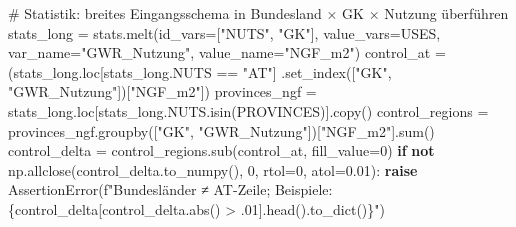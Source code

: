 \documentclass[
  ngerman,
  a4paper,
  DIV=11]{scrreprt}
\newenvironment{Shaded}{\begin{snugshade}}{\end{snugshade}}
\newcommand{\BuiltInTok}[1]{\textcolor[rgb]{0.00,0.23,0.31}{#1}}
\newcommand{\CommentTok}[1]{\textcolor[rgb]{0.37,0.37,0.37}{#1}}
\newcommand{\ControlFlowTok}[1]{\textcolor[rgb]{0.00,0.23,0.31}{\textbf{#1}}}
\newcommand{\DecValTok}[1]{\textcolor[rgb]{0.68,0.00,0.00}{#1}}
\newcommand{\FloatTok}[1]{\textcolor[rgb]{0.68,0.00,0.00}{#1}}
\newcommand{\KeywordTok}[1]{\textcolor[rgb]{0.00,0.23,0.31}{\textbf{#1}}}
\newcommand{\NormalTok}[1]{\textcolor[rgb]{0.00,0.23,0.31}{#1}}
\newcommand{\OperatorTok}[1]{\textcolor[rgb]{0.37,0.37,0.37}{#1}}
\newcommand{\PreprocessorTok}[1]{\textcolor[rgb]{0.68,0.00,0.00}{#1}}
\newcommand{\SpecialCharTok}[1]{\textcolor[rgb]{0.37,0.37,0.37}{#1}}
\newcommand{\SpecialStringTok}[1]{\textcolor[rgb]{0.13,0.47,0.30}{#1}}
\newcommand{\StringTok}[1]{\textcolor[rgb]{0.13,0.47,0.30}{#1}}
\begin{document}
\begin{Shaded}
\begin{Highlighting}[]
\CommentTok{\# Statistik: breites Eingangsschema in Bundesland × GK × Nutzung überführen}
\NormalTok{stats\_long }\OperatorTok{=}\NormalTok{ stats.melt(id\_vars}\OperatorTok{=}\NormalTok{[}\StringTok{"NUTS"}\NormalTok{, }\StringTok{"GK"}\NormalTok{], value\_vars}\OperatorTok{=}\NormalTok{USES,}
\NormalTok{                        var\_name}\OperatorTok{=}\StringTok{"GWR\_Nutzung"}\NormalTok{, value\_name}\OperatorTok{=}\StringTok{"NGF\_m2"}\NormalTok{)}
\NormalTok{control\_at }\OperatorTok{=}\NormalTok{ (stats\_long.loc[stats\_long.NUTS }\OperatorTok{==} \StringTok{"AT"}\NormalTok{]}
\NormalTok{              .set\_index([}\StringTok{"GK"}\NormalTok{, }\StringTok{"GWR\_Nutzung"}\NormalTok{])[}\StringTok{"NGF\_m2"}\NormalTok{])}
\NormalTok{provinces\_ngf }\OperatorTok{=}\NormalTok{ stats\_long.loc[stats\_long.NUTS.isin(PROVINCES)].copy()}
\NormalTok{control\_regions }\OperatorTok{=}\NormalTok{ provinces\_ngf.groupby([}\StringTok{"GK"}\NormalTok{, }\StringTok{"GWR\_Nutzung"}\NormalTok{])[}\StringTok{"NGF\_m2"}\NormalTok{].}\BuiltInTok{sum}\NormalTok{()}
\NormalTok{control\_delta }\OperatorTok{=}\NormalTok{ control\_regions.sub(control\_at, fill\_value}\OperatorTok{=}\DecValTok{0}\NormalTok{)}
\ControlFlowTok{if} \KeywordTok{not}\NormalTok{ np.allclose(control\_delta.to\_numpy(), }\DecValTok{0}\NormalTok{, rtol}\OperatorTok{=}\DecValTok{0}\NormalTok{, atol}\OperatorTok{=}\FloatTok{0.01}\NormalTok{):}
    \ControlFlowTok{raise} \PreprocessorTok{AssertionError}\NormalTok{(}\SpecialStringTok{f"Bundesländer ≠ AT{-}Zeile; Beispiele: }\SpecialCharTok{\{}\NormalTok{control\_delta[control\_delta.}\BuiltInTok{abs}\NormalTok{() }\OperatorTok{\textgreater{}} \FloatTok{.01}\NormalTok{]}\SpecialCharTok{.}\NormalTok{head()}\SpecialCharTok{.}\NormalTok{to\_dict()}\SpecialCharTok{\}}\SpecialStringTok{"}\NormalTok{)}


\end{Highlighting}
\end{Shaded}
\end{document}
